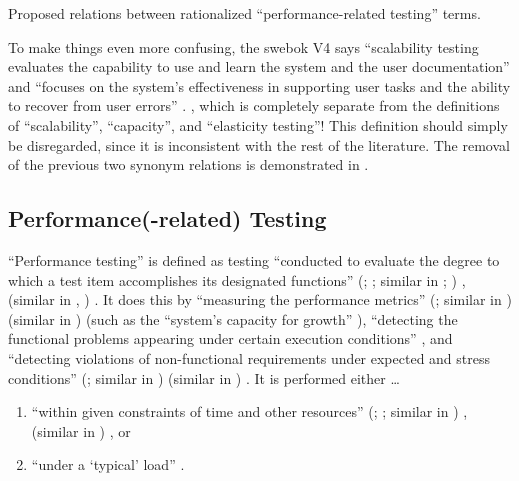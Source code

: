 \begin{paperFigure}
    \centering
    \performanceGraph{}
    \caption{Proposed relations between rationalized ``performance-related testing'' terms.}
    \label{fig:perf-graph}
\end{paperFigure}

To make things even more confusing, the \acs{swebok} V4 says ``scalability
testing evaluates the capability to use and learn the system and the user
documentation'' and ``focuses on the system's effectiveness in supporting user
tasks and the ability to recover from user errors'' \citep[p.~5-9]{SWEBOK2024}.
\swebokScalDef{}, which is completely separate from the definitions of
``scalability'', ``capacity'', and ``elasticity testing''! This definition
should simply be disregarded, since it is inconsistent with the rest of the
literature. The removal of the previous two synonym relations is demonstrated
in .

\subsection{Performance(-related) Testing}
\label{perf-test-rec}

``Performance testing'' is defined as testing ``conducted to evaluate the
degree to which a test item accomplishes its designated functions''
\ifnotpaper
    (\citealp[p.~7]{IEEE2022}; \citeyear[p.~320]{IEEE2017}; similar in
    \citeyear[pp.~38-39]{IEEE2021}; \citealp[p.~1187]{Moghadam2019})%
\else
    \cite[p.~320]{IEEE2017}, \cite[p.~7]{IEEE2022} (similar in
    \cite[pp.~38-39]{IEEE2021}, \cite[p.~1187]{Moghadam2019})%
\fi. It does this
by ``measuring the performance metrics''
\ifnotpaper
    (\citealp[p.~1187]{Moghadam2019}; similar in \citealpISTQB{})
\else
    \cite[p.~1187]{Moghadam2019} (similar in \cite{ISTQB})
\fi (such as the ``system's capacity for growth''
\citep[p.~23]{Gerrard2000b}), ``detecting the functional problems appearing
under certain execution conditions'' \citep[p.~1187]{Moghadam2019}, and
``detecting violations of non-functional requirements under expected and
stress conditions'' \ifnotpaper
    (\citealp[p.~1187]{Moghadam2019}; similar in \citealp[p.~5-9]{SWEBOK2024})%
\else
    \cite[p.~1187]{Moghadam2019} (similar in \cite[p.~5-9]{SWEBOK2024})%
\fi. It is performed either \dots\
\begin{enumerate}
    \item ``within given constraints of time and other resources''
          \ifnotpaper
              (\citealp[p.~7]{IEEE2022}; \citeyear[p.~320]{IEEE2017};
              similar in \citealp[p.~1187]{Moghadam2019})%
          \else
              \cite[p.~320]{IEEE2017}, \cite[p.~7]{IEEE2022} (similar
              in \cite[p.~1187]{Moghadam2019})%
          \fi, or
    \item ``under a `typical' load'' \citep[p.~39]{IEEE2021}.
\end{enumerate}

